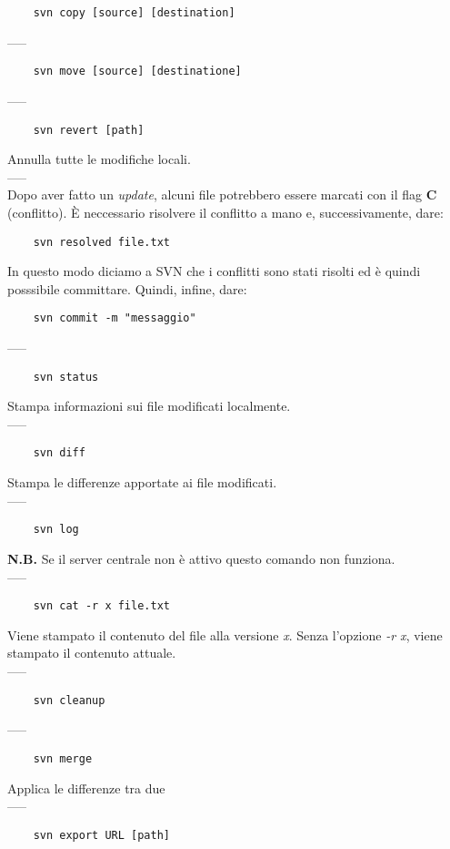 \documentclass[a4paper]{article}
\begin{document}
	\begin{verbatim}
	svn copy [source] [destination]
	\end{verbatim}
	-----
	\begin{verbatim}
	svn move [source] [destinatione]
	\end{verbatim}
	-----
	\begin{verbatim}
	svn revert [path]
	\end{verbatim}
	Annulla tutte le modifiche locali.\\-----\\
	Dopo aver fatto un \textit{update}, alcuni file potrebbero essere marcati con il flag \textbf{C} (conflitto). È neccessario risolvere il conflitto a mano e, successivamente, dare:
	\begin{verbatim}
	svn resolved file.txt
	\end{verbatim}
	In questo modo diciamo a SVN che i conflitti sono stati risolti ed è quindi posssibile committare. Quindi, infine, dare:
	\begin{verbatim}
	svn commit -m "messaggio"
	\end{verbatim}
	-----\\
	\begin{verbatim}
	svn status
	\end{verbatim}
	Stampa informazioni sui file modificati localmente.
	\\-----
	\begin{verbatim}
	svn diff
	\end{verbatim}
	Stampa le differenze apportate ai file modificati.\\-----
	\begin{verbatim}
	svn log
	\end{verbatim}
	\textbf{N.B.} Se il server centrale non è attivo questo comando non funziona.
	\\-----
	\begin{verbatim}
	svn cat -r x file.txt 
	\end{verbatim}
	Viene stampato il contenuto del file alla versione \textit{x}. Senza l'opzione \textit{-r x}, viene stampato il contenuto attuale.\\-----
	\begin{verbatim}
	svn cleanup
	\end{verbatim}
	-----
	\begin{verbatim}
	svn merge
	\end{verbatim}
	Applica le differenze tra due\\-----
	\begin{verbatim}
	svn export URL [path]
	\end{verbatim}
\end{document}
